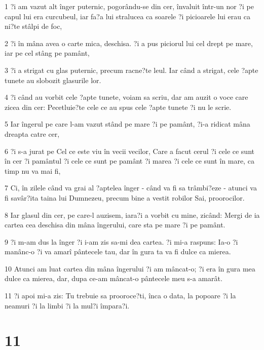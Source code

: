 \par 1 ?i am vazut alt înger puternic, pogorându-se din cer, învaluit într-un nor ?i pe capul lui era curcubeul, iar fa?a lui stralucea ca soarele ?i picioarele lui erau ca ni?te stâlpi de foc,
\par 2 ?i în mâna avea o carte mica, deschisa. ?i a pus piciorul lui cel drept pe mare, iar pe cel stâng pe pamânt,
\par 3 ?i a strigat cu glas puternic, precum racne?te leul. Iar când a strigat, cele ?apte tunete au slobozit glasurile lor.
\par 4 ?i când au vorbit cele ?apte tunete, voiam sa scriu, dar am auzit o voce care zicea din cer: Pecetluie?te cele ce au spus cele ?apte tunete ?i nu le scrie.
\par 5 Iar îngerul pe care l-am vazut stând pe mare ?i pe pamânt, ?i-a ridicat mâna dreapta catre cer,
\par 6 ?i s-a jurat pe Cel ce este viu în vecii vecilor, Care a facut cerul ?i cele ce sunt în cer ?i pamântul ?i cele ce sunt pe pamânt ?i marea ?i cele ce sunt în mare, ca timp nu va mai fi,
\par 7 Ci, în zilele când va grai al ?aptelea înger - când va fi sa trâmbi?eze - atunci va fi savâr?ita taina lui Dumnezeu, precum bine a vestit robilor Sai, proorocilor.
\par 8 Iar glasul din cer, pe care-l auzisem, iara?i a vorbit cu mine, zicând: Mergi de ia cartea cea deschisa din mâna îngerului, care sta pe mare ?i pe pamânt.
\par 9 ?i m-am dus la înger ?i i-am zis sa-mi dea cartea. ?i mi-a raspuns: Ia-o ?i manânc-o ?i va amarî pântecele tau, dar în gura ta va fi dulce ca mierea.
\par 10 Atunci am luat cartea din mâna îngerului ?i am mâncat-o; ?i era în gura mea dulce ca mierea, dar, dupa ce-am mâncat-o pântecele meu s-a amarât.
\par 11 ?i apoi mi-a zis: Tu trebuie sa prooroce?ti, înca o data, la popoare ?i la neamuri ?i la limbi ?i la mul?i împara?i.

\chapter{11}

